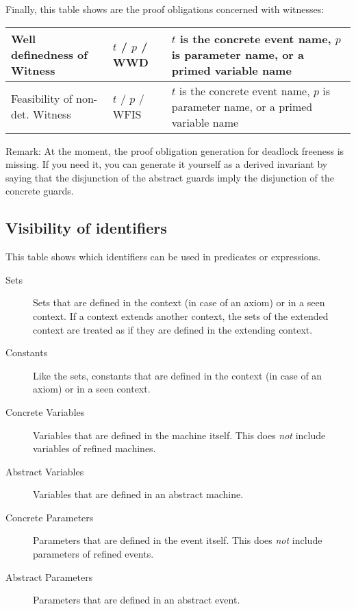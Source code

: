 Finally, this table shows are the proof obligations concerned with witnesses:

\begin{center}
    \begin{tabular}{| p{6cm} | p{3cm} | p{5cm} |}
    \hline
	Well definedness of Witness & $t$  / $p$  / WWD & $t$ is the concrete event name, $p$ is parameter name, or a primed variable name \\ \hline
	Feasibility of non-det. Witness & $t$  / $p$  / WFIS & $t$ is the concrete event name, $p$ is parameter name, or a primed variable name \\ \hline
    \end{tabular}
\end{center}

Remark: At the moment, the proof obligation generation for deadlock freeness is missing. If you need it, you can generate it yourself as a derived invariant by saying that the disjunction of the abstract guards imply the disjunction of the concrete guards.

\subsection{Visibility of identifiers}
\label{visibility_of_identifiers}

This table shows which identifiers can be used in predicates or expressions. 
\begin{description}
\item[Sets] Sets that are defined in the context (in case of an axiom) or in a seen context.
  If a context extends another context, the sets of the extended context are treated as if they
  are defined in the extending context.
\item[Constants] Like the sets, constants that are defined in the context (in case of an axiom) or
  in a seen context.
\item[Concrete Variables] Variables that are defined in the machine itself. This does \emph{not}
  include variables of refined machines.
\item[Abstract Variables] Variables that are defined in an abstract machine.
\item[Concrete Parameters] Parameters that are defined in the event itself. This does \emph{not}
  include parameters of refined events.
\item[Abstract Parameters] Parameters that are defined in an abstract event.
\end{description}

